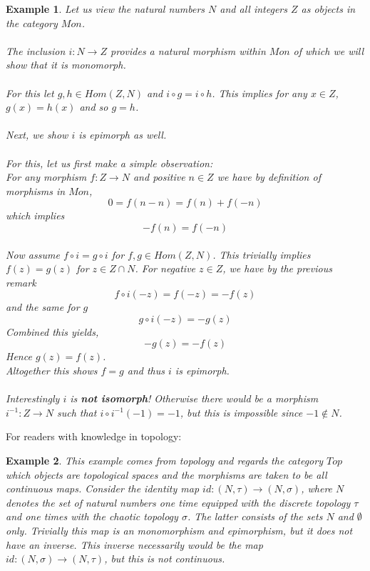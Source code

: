\documentclass[17pt]{extarticle}
\newtheorem{example}{Example}
\begin{document}
\begin{example}
	Let us view the natural numbers $N$ and all integers $Z$ as objects in the category $Mon$.\\ \\
	The inclusion $i:N\rightarrow Z$ provides a natural morphism within $Mon$ of which we will show that it is monomorph.\\ \\
	For this let $g,h\in Hom(Z,N)$ and $i\circ g=i\circ h$.
	This implies for any $x\in Z$, $g(x)=h(x)$ and so $g=h$.\\ \\	
	Next, we show $i$ is epimorph as well.\\ \\
	For this, let us first make a simple observation:\\
	For any morphism $f:Z\rightarrow N$ and positive $n\in Z$ we have by definition of morphisms in $Mon$,\\
	$$0=f(n-n)=f(n)+f(-n)$$
	which implies 
	$$-f(n)=f(-n)$$\\
	Now assume $f\circ i =g\circ i$ for $f,g\in Hom(Z,N)$. This trivially implies $f(z)=g(z)$ for $z\in Z\cap N$.
	For negative $z\in Z$, we have by the previous remark
	$$f\circ i(-z)=f(-z)=-f(z)$$
	and the same for $g$
	$$g\circ i(-z)=-g(z)$$
	Combined this yields, 
	$$-g(z)=-f(z)$$
	Hence $g(z)=f(z)$.\\
	Altogether this shows $f=g$ and thus $i$ is epimorph.\\ \\
	Interestingly $i$ is \textbf{not isomorph}! Otherwise there would be a morphism $i^{-1}:Z\rightarrow N$
	such that $i\circ i^{-1}(-1)=-1$, but this is impossible since $-1\notin N$.	
\end{example}
\leavevmode\newline
For readers with knowledge in topology:
\begin{example}
	This example comes from topology and regards the category $Top$ which objects are topological spaces and the morphisms are taken to be all continuous maps. Consider the identity map $id: (N, \tau)\rightarrow (N,\sigma)$, where $N$ denotes the set of natural numbers one time equipped with the discrete topology $\tau$ and one times with the chaotic topology $\sigma$. The latter consists of the sets $N$ and $\emptyset$ only. Trivially this map is an monomorphism and epimorphism, but it does not have an inverse. This inverse necessarily would be the map  $id: (N, \sigma)\rightarrow (N,\tau)$, but this is not continuous.
\end{example}
\end{document}
